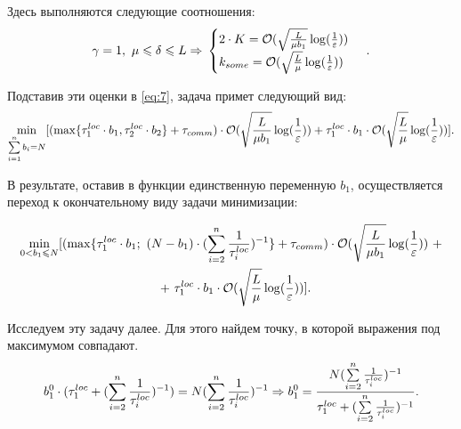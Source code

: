 \documentclass{article}
\theoremstyle{definition}
\theoremstyle{plain}
\begin{document}
Здесь выполняются следующие соотношения:
\begin{equation}
    \notag
    \gamma = 1, ~ \mu \leq \delta \leq L \Rightarrow 
    \\
    \notag
    \begin{cases}
      2\cdot K =  \mathcal O(\sqrt{\frac{L}{\mu b_1}}\log(\frac{1}{\varepsilon}))\\
      k_{some} = \mathcal O(\sqrt{\frac{L}{\mu}}\log(\frac{1}{\varepsilon}))
    \end{cases}\,.
\end{equation}

Подставив эти оценки в \eqref{eq:7}, задача примет следующий вид:
\begin{equation}
    \notag
    \underset{\sum\limits_{i = 1}^{n} b_i = N}{\min}[(\max\{\tau_1^{loc}\cdot b_1, \tau_2^{loc}\cdot b_2\} + \tau_{comm}) \cdot \mathcal O(\sqrt{\frac{L}{\mu {b_1}}}\log(\frac{1}{\varepsilon})) + \tau_1^{loc}\cdot b_1 \cdot \mathcal O(\sqrt{\frac{L}{\mu}}\log(\frac{1}{\varepsilon}))].
\end{equation}

В результате, оставив в функции единственную переменную $b_1$, осуществляется переход к окончательному виду задачи минимизации:

\begin{eqnarray}
    \begin{split}
    \label{eq:fm1}
        \underset{0 < b_1 \leq N}{\min}[(\max\{\tau_1^{loc}\cdot b_1; ~(N-b_1) \cdot (\sum\limits_{i = 2}^{n} \frac{1}{\tau_i^{loc}} )^{-1}\} + \tau_{comm}) \cdot \mathcal O(\sqrt{\frac{L}{\mu b_1}}\log(\frac{1}{\varepsilon})) ~+
        \\ + ~
        \tau_1^{loc}\cdot b_1 \cdot \mathcal O(\sqrt{\frac{L}{\mu}}\log(\frac{1}{\varepsilon}))]. \hspace{3.7cm}
    \end{split}
\end{eqnarray}

Исследуем эту задачу далее. Для этого найдем точку, в которой выражения под максимумом совпадают. 
\begin{equation}
    \notag
    b_1^0 \cdot (\tau_1^{loc} + (\sum\limits_{i = 2}^{n} \frac{1}{\tau_i^{loc}})^{-1}) = N (\sum\limits_{i = 2}^{n} \frac{1}{\tau_i^{loc}})^{-1} \Rightarrow b_1^0 = \frac{N (\sum\limits_{i = 2}^{n} \frac{1}{\tau_i^{loc}})^{-1}}{\tau_1^{loc} + (\sum\limits_{i = 2}^{n} \frac{1}{\tau_i^{loc}})^{-1}}.
\end{equation}
\end{document}
